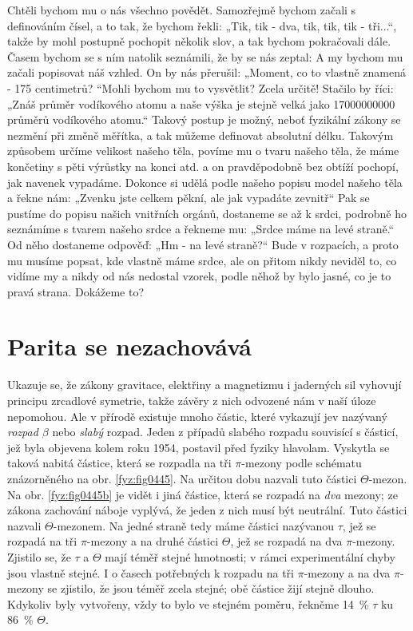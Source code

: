     Chtěli bychom mu o nás všechno povědět. Samozřejmě bychom začali s deﬁnováním čísel, a to tak,
    že bychom řekli: „Tik, tik - dva, tik, tik, tik - tři...“, takže by mohl postupně pochopit
    několik slov, a tak bychom pokračovali dále. Časem bychom se s ním natolik seznámili, že by se
    nás zeptal:  A my bychom mu začali popisovat náš vzhled.  On by nás přerušil: „Moment, co to vlastně znamená - 175 centimetrů?
    “Mohli bychom mu to vysvětlit? Zcela určitě! Stačilo by říci: „Znáš průměr vodíkového atomu a
    naše výška je stejně velká jako \num{17 000 000 000} průměrů vodíkového atomu.“ Takový postup je
    možný, neboť fyzikální zákony se nezmění při změně měřítka, a tak můžeme deﬁnovat absolutní
    délku. Takovým způsobem určíme velikost našeho těla, povíme mu o tvaru našeho těla, že máme
    končetiny s pěti výrůstky na konci atd. a on pravděpodobně bez obtíží pochopí, jak navenek
    vypadáme. Dokonce si udělá podle našeho popisu model našeho těla a řekne nám: „Zvenku jste
    celkem pěkní, ale jak vypadáte zevnitř“ Pak se pustíme do popisu našich vnitřních orgánů,
    dostaneme se až k srdci, podrobně ho seznámíme s tvarem našeho srdce a řekneme mu: „Srdce máme
    na levé straně.“ Od něho dostaneme odpověď: „Hm - na levé straně?“ Bude v rozpacích, a proto mu
    musíme popsat, kde vlastně máme srdce, ale on přitom nikdy neviděl to, co vidíme my a nikdy od
    nás nedostal vzorek, podle něhož by bylo jasné, co je to pravá strana. Dokážeme to?
  
  \section{Parita se nezachovává}\label{fyz:IchapLIIsecVII}
    Ukazuje se, že zákony gravitace, elektřiny a magnetizmu i jaderných sil vyhovují principu
    zrcadlové symetrie, takže závěry z nich odvozené nám v naší úloze nepomohou. Ale v přírodě
    existuje mnoho částic, které vykazují jev nazývaný \emph{rozpad \(\beta\)} nebo \emph{slabý}
    rozpad. Jeden z případů slabého rozpadu souvisící s částicí, jež byla objevena kolem roku 1954,
    postavil před fyziky hlavolam. Vyskytla se taková nabitá částice, která se rozpadla na tři
    \(\pi\)-mezony podle schématu znázorněného na obr. \ref{fyz:fig0445}. Na určitou dobu nazvali
    tuto částici \(\varTheta\)-mezon. Na obr. \ref{fyz:fig0445b} je vidět i jiná částice, která se
    rozpadá na \emph{dva} mezony; ze zákona zachování náboje vyplývá, že jeden z nich musí být
    neutrální. Tuto částici nazvali \(\varTheta\)-mezonem. Na jedné straně tedy máme částici
    nazývanou \(\tau\), jež se rozpadá na tři \(\pi\)-mezony a na druhé částici \(\varTheta\), jež
    se rozpadá na dva \(\pi\)-mezony. Zjistilo se, že \(\tau\) a \(\varTheta\) mají téměř stejné
    hmotnosti; v rámci experimentální chyby jsou vlastně stejné. I o časech potřebných k rozpadu na
    tři \(\pi\)-mezony a na dva \(\pi\)-mezony se zjistilo, že jsou téměř zcela stejné; obě částice
    žijí stejně dlouho. Kdykoliv byly vytvořeny, vždy to bylo ve stejném poměru, řekněme
    \qty{14}{\percent} \(\tau\) ku \qty{86}{\percent} \(\varTheta\).  
  
